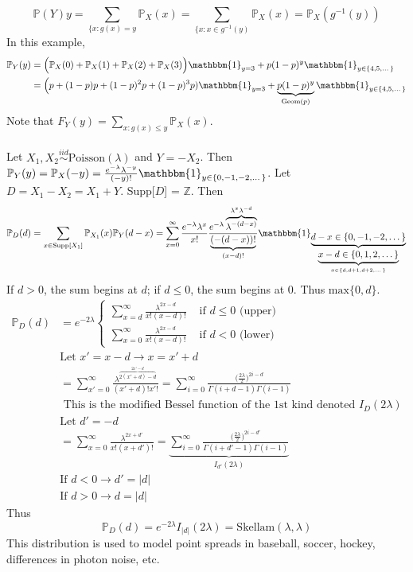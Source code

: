 \documentclass[12pt]{article}
\newcommand{\prob}[1]{\mathbb{P}(#1)}
\newcommand{\probsub}[2]{\mathbb{P}_{#1}(#2)}
\newcommand{\indicator}[1]{\mathbbm{1}_{#1}}
\newcommand{\iid}{\stackrel{iid}{\sim}}
\newcommand{\supp}[1]{\text{Supp}[ #1 ]}
\renewcommand{\max}[1]{\text{max}\{#1\}}
\newcommand{\ginvy}{g^{-1}(y)}
\begin{document}
$$\prob{Y}{y} = \sum_{\{x : g(x) = y} \probsub{X}{x} = \sum_{\{x: x \in \ginvy} \probsub{X}{x} = \probsub{X}{\ginvy} $$ In this example, $$ \begin{aligned} \probsub{Y}{y} &= \Big( \probsub{X}{0} + \probsub{X}{1} + \probsub{X}{2} + \probsub{X}{3}\Big)\indicator{y=  3} + p(1 - p)^y \indicator{y \in \{4, 5, \dots\}} \\ &= \Big( p + (1 - p)p + (1 - p)^2p + (1 - p)^3p)\indicator{y = 3} + \underbrace{p(1 - p)^y}_{\text{Geom}(p)}\indicator{y \in \{4, 5, \dots\}} \end{aligned} $$ 
Note that $F_Y(y) = \sum_{x: g(x) \leq y} \probsub{X}{x} $. \\~\\ 
Let $X_1, X_2 \iid \text{Poisson}(\lambda)$ and $Y = -X_2$. Then $\probsub{Y}{y} = \probsub{X}{-y} = \frac{e^{-\lambda} \lambda^{-y}}{(-y)!} \indicator{y \in \{0, -1, -2, \dots\}}$. Let $D = X_1 - X_2 = X_1 + Y$. Supp[$D$] = $\mathbb{Z}$. Then $$ \probsub{D}{d} = \sum_{x \in \supp{X_1}} \probsub{X_1}{x}\probsub{Y}{d - x} = \sum_{x = 0}^\infty \frac{e^{-\lambda} \lambda^x}{x!} \frac{e^{-\lambda} \overbrace{\lambda^{-(d - x)}}^{\lambda^x \lambda^{-d}}}{\underbrace{(-(d - x))!}_{(x - d)!}} \indicator{\underbrace{d - x \in \{0, -1, -2, \dots\}}_{\underbrace{x - d \in \{0, 1, 2, \dots\}}_{x \in \{d, d+1, d+2, \dots\}}}} $$ If $d > 0$, the sum begins at $d$; if $d \leq 0$, the sum begins at 0. Thus $\max{0, d}$. 
$$ \begin{aligned} \probsub{D}{d} &= e^{-2\lambda} \begin{cases} \sum_{x = d}^\infty \frac{\lambda^{2x - d}}{x!(x - d)!} &\text{ if } d \leq 0 \text{ (upper)} \\ \sum_{x = 0}^\infty \frac{\lambda^{2x - d}}{x!(x - d)!} &\text{ if } d < 0 \text{ (lower)} \end{cases} \\ &\text{Let } x' = x - d \to x = x' + d \\ &= \sum_{x' = 0}^\infty \frac{\lambda^{\overbrace{2(x' + d) - d}^{2x' - d}}}{(x' + d)! x'!} = \sum_{i = 0}^\infty \frac{\Big( \frac{2\lambda}{2}\Big)^{2i - d}}{\Gamma(i + d - 1)\Gamma(i - 1)} \\ &\text{ This is the modified Bessel function of the 1st kind denoted } I_D(2\lambda) \\ &\text{Let } d' = -d \\ &= \sum_{x = 0}^\infty \frac{\lambda^{2x + d'}}{x!(x + d')!} = \underbrace{\sum_{i = 0}^\infty \frac{\Big( \frac{2\lambda}{2}\Big)^{2i - d'}}{\Gamma(i + d' - 1)\Gamma(i - 1)}}_{I_{d'}(2\lambda)} \\ &\text{If } d < 0 \to d' = |d| \\ &\text{If } d > 0 \to d = |d| \end{aligned} $$ Thus $$\probsub{D}{d} = e^{-2\lambda}I_{|d|}(2\lambda) = \text{Skellam}(\lambda, \lambda) $$ This distribution is used to model point spreads in baseball, soccer, hockey, differences in photon noise, etc. \\~\\
\end{document}
